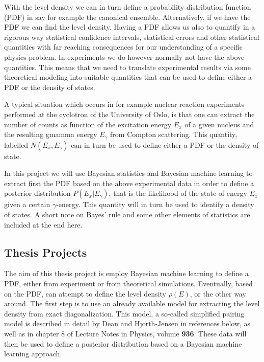 \documentclass[%
oneside,                 %
final,                   %
10pt]{article}
\begin{document}
With the level density we can in turn define a probability
distribution function (PDF) in say for example the canonical
ensemble. Alternatively, if we have the PDF we can find the level density.
Having a PDF allows us also to quantify in a rigorous way statistical
confidence intervals, statistical errors and other statistical quantities with far reaching
consequences for our understanding of a specific physics problem. 
In experiments we do however normally not have the above
quantities. This means that we need to translate experimental results
via some theoretical modeling into suitable quantities that can be
used to define either a PDF or the density of states.

A typical situation which occurs in for example nuclear reaction
experiments performed at the cyclotron of the University of Oslo, is
that one can extract the number of counts as function of the
excitation energy $E_x$ of a given nucleus and the resulting gmamma
energy $E_{\gamma}$ from Compton scattering. This quantity, labelled
$N(E_x,E_{\gamma})$ can in turn be used to define either a PDF or the density of state.


In this project we will use Bayesian statistics and Bayesian machine
learning to extract first the PDF based on the above experimental data
in order to define a posterior distribution $P(E_x\vert E_{\gamma})$,
that is the likelihood of the state of energy $E_x$ given a certain
$\gamma$-energy.  This quantity will in turn be used to identify a
density of states. A short note on Bayes' rule and some other elements of statistics are included at the end here.


\subsection{Thesis Projects}

The aim of this thesis project is employ Bayesian machine learning to
define a PDF, either from experiment or from theoretical simulations.
Eventually, based on the PDF, can attempt to define the level density
$\rho(E)$, or the other way around. The first step is to use an
already available model for extracting the level density from exact
diagonalization. This model, a so-called simplified pairing model is
described in detail by Dean and Hjorth-Jensen in references below, as
well as in chapter 8 of Lecture Notes in Physics, volume \textbf{936}.  These
data will then be used to define a posterior distribution based on a
Bayesian machine learning approach.
\end{document}
